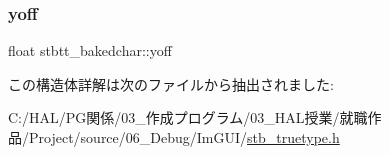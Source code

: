\mbox{\label{structstbtt__bakedchar_aba01393e52d1c6f4ce86a8b51e498bb4}} 
\subsubsection{\texorpdfstring{yoff}{yoff}}
{\footnotesize\ttfamily float stbtt\+\_\+bakedchar\+::yoff}



この構造体詳解は次のファイルから抽出されました\+:\begin{DoxyCompactItemize}
\item 
C\+:/\+H\+A\+L/\+P\+G関係/03\+\_\+作成プログラム/03\+\_\+\+H\+A\+L授業/就職作品/\+Project/source/06\+\_\+\+Debug/\+Im\+G\+U\+I/\mbox{\hyperlink{stb__truetype_8h}{stb\+\_\+truetype.\+h}}\end{DoxyCompactItemize}
